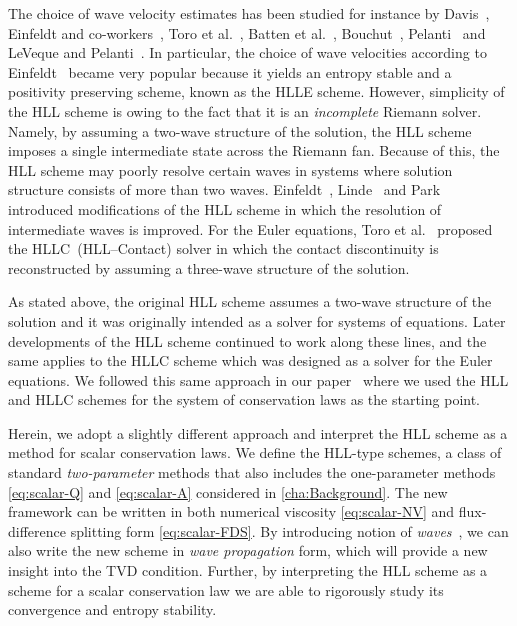 The choice of wave velocity estimates has been studied for instance by Davis~\cite{dav88}, Einfeldt and co-workers~\cite{ein88,ein91}, Toro et al.~\cite{tor94}, Batten et al.~\cite{bat97}, Bouchut~\cite{bou04}, Pelanti~\cite{pel01} and LeVeque and Pelanti~\cite{lev01}. In particular, the choice of wave velocities according to Einfeldt~\cite{ein88} became very popular because it yields an entropy stable and a positivity preserving scheme, known as the HLLE scheme. However, simplicity of the HLL scheme is owing to the fact that it is an \textit{incomplete} Riemann solver. Namely, by assuming a two-wave structure of the solution, the HLL scheme imposes a single intermediate state across the Riemann fan. Because of this, the HLL scheme may poorly resolve certain waves in systems where solution structure consists of more than two waves. Einfeldt~\cite{ein88}, Linde~\cite{lin02} and Park~\cite{par03} introduced modifications of the HLL scheme in which the resolution of intermediate waves is improved. For the Euler equations, Toro et al.~\cite{tor94} proposed the HLLC~(HLL--Contact) solver in which the contact discontinuity is reconstructed by assuming a three-wave structure of the solution.

As stated above, the original HLL scheme assumes a two-wave structure of the solution and it was originally intended as a solver for systems of equations. Later developments of the HLL scheme continued to work along these lines, and the same applies to the HLLC scheme which was designed as a solver for the Euler equations. We followed this same approach in our paper~\cite{jp2} where we used the HLL and HLLC schemes for the system of conservation laws as the starting point.

Herein, we adopt a slightly different approach and interpret the HLL scheme as a method for scalar conservation laws. We define the HLL-type schemes, a class of standard \textit{two-parameter} methods that also includes the one-parameter methods \eqref{eq:scalar-Q} and \eqref{eq:scalar-A} considered in \cref{cha:Background}. The new framework can be written in both numerical viscosity \eqref{eq:scalar-NV} and flux-difference splitting form \eqref{eq:scalar-FDS}. By introducing notion of \textit{waves}~\cite{lev02}, we can also write the new scheme in \textit{wave propagation} form, which will provide a new insight into the TVD condition. Further, by interpreting the HLL scheme as a scheme for a scalar conservation law we are able to rigorously study its convergence and entropy stability.

